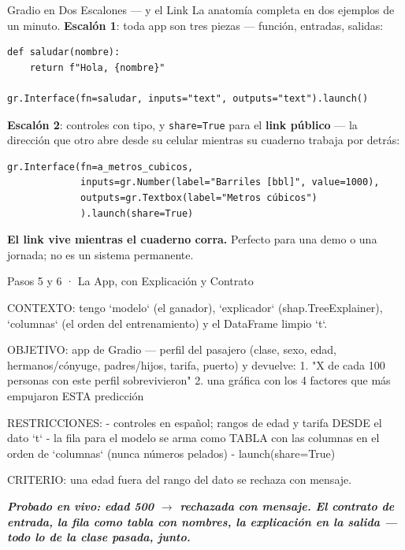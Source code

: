 \documentclass[aspectratio=169, 11pt]{beamer}
\begin{document}
\begin{frame}[fragile, shrink=5]{Gradio en Dos Escalones --- y el Link}
  \vspace{-2pt}
  {\scriptsize\color{textMuted}
   La anatomía completa en dos ejemplos de un minuto. \textbf{Escalón 1}:
   toda app son tres piezas --- función, entradas, salidas:}
  \vspace{2pt}
  \begin{verbatim}
def saludar(nombre):
    return f"Hola, {nombre}"

gr.Interface(fn=saludar, inputs="text", outputs="text").launch()
  \end{verbatim}
  \vspace{2pt}
  {\scriptsize\color{textMuted}
   \textbf{Escalón 2}: controles con tipo, y \texttt{share=True} para el
   \textbf{link público} --- la dirección que otro abre desde su celular
   mientras su cuaderno trabaja por detrás:}
  \vspace{2pt}
  \begin{verbatim}
gr.Interface(fn=a_metros_cubicos,
             inputs=gr.Number(label="Barriles [bbl]", value=1000),
             outputs=gr.Textbox(label="Metros cúbicos")
             ).launch(share=True)
  \end{verbatim}
  \vspace{2pt}
  {\scriptsize\color{arcaRed}\bfseries
   El link vive mientras el cuaderno corra.} {\scriptsize\color{textMuted}
   Perfecto para una demo o una jornada; no es un sistema permanente.}
\end{frame}

\begin{frame}[shrink=5]{Pasos 5 y 6 · La App, con Explicación y Contrato}
  \vspace{2pt}
  \begin{prompt}
CONTEXTO: tengo `modelo` (el ganador), `explicador`
(shap.TreeExplainer), `columnas` (el orden del
entrenamiento) y el DataFrame limpio `t`.

OBJETIVO: app de Gradio --- perfil del pasajero
(clase, sexo, edad, hermanos/cónyuge, padres/hijos,
tarifa, puerto) y devuelve:
1. "X de cada 100 personas con este perfil
   sobrevivieron"
2. una gráfica con los 4 factores que más empujaron
   ESTA predicción

RESTRICCIONES:
- controles en español; rangos de edad y tarifa
  DESDE el dato `t`
- la fila para el modelo se arma como TABLA con las
  columnas en el orden de `columnas` (nunca números
  pelados)
- launch(share=True)

CRITERIO: una edad fuera del rango del dato se
rechaza con mensaje.
  \end{prompt}
  \vspace{3pt}
  {\scriptsize\color{arcaDark}\bfseries\itshape
   Probado en vivo: edad 500 $\to$ rechazada con mensaje. El contrato de
   entrada, la fila como tabla con nombres, la explicación en la salida ---
   todo lo de la clase pasada, junto.}
\end{frame}
\end{document}

